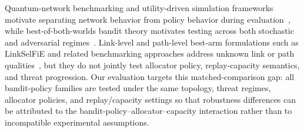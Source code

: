 Quantum-network benchmarking and utility-driven simulation frameworks motivate separating network behavior from policy behavior during evaluation~\cite{coopmans2021benchmark,kozlowski2022utility}, while best-of-both-worlds bandit theory motivates testing across both stochastic and adversarial regimes~\cite{zimmert2019optimal}. Link-level and path-level best-arm formulations such as LinkSelFiE and related benchmarking approaches address unknown link or path qualities~\cite{10621263,wang2025learning}, but they do not jointly test allocator policy, replay-capacity semantics, and threat progression. Our evaluation targets this matched-comparison gap: all bandit-policy families are tested under the same topology, threat regimes, allocator policies, and replay/capacity settings so that robustness differences can be attributed to the bandit-policy--allocator--capacity interaction rather than to incompatible experimental assumptions.
